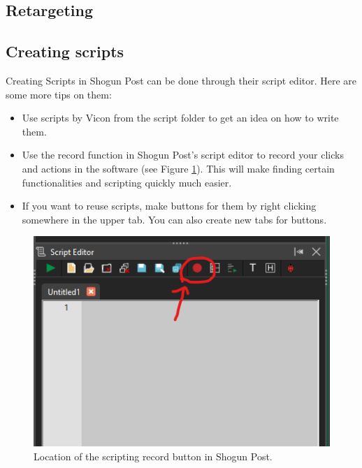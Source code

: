 \documentclass{uva-inf-article}
\begin{document}
\subsection{Retargeting}

\subsection{Creating scripts}
Creating Scripts in Shogun Post can be done through their script editor. Here are some more tips on them:
\begin{itemize}
    \item Use scripts by Vicon from the script folder to get an idea on how to write them.
    \item Use the record function in Shogun Post's script editor to record your clicks and actions in the software (see Figure \ref{fig:recordButton}). This will make finding certain functionalities and scripting quickly much easier.
    \item If you want to reuse scripts, make buttons for them by right clicking somewhere in the upper tab. You can also create new tabs for buttons.
\end{itemize}

\begin{figure}[hbt!]
    \centering
    \includegraphics[]{imgs/recordButton.png}
    \caption{Location of the scripting record button in Shogun Post.}
    \label{fig:recordButton}
\end{figure}
\end{document}
